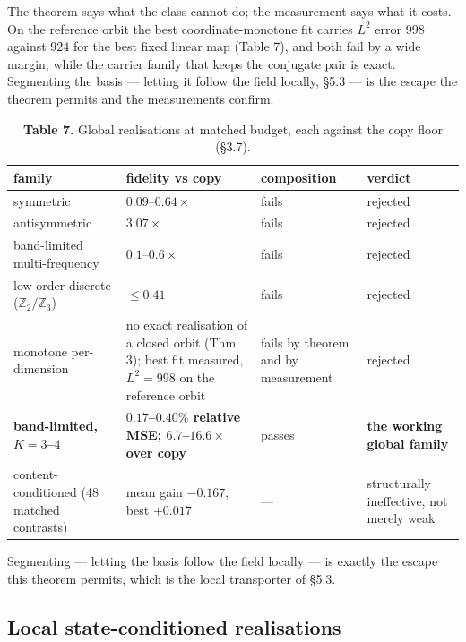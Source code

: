 The theorem says what the class cannot do; the measurement says what it costs. On the reference orbit the best coordinate-monotone fit carries $L^2$ error $998$ against $924$ for the best fixed linear map (Table 7), and both fail by a wide margin, while the carrier family that keeps the conjugate pair is exact. Segmenting the basis --- letting it follow the field locally, \S{}5.3 --- is the escape the theorem permits and the measurements confirm.


\begin{table}[t]
\centering
\small
\caption*{\textbf{Table 7.} Global realisations at matched budget, each against the copy floor (\S{}3.7).}
\begin{tabularx}{\textwidth}{@{}>{\raggedright\arraybackslash}X >{\raggedright\arraybackslash}X >{\raggedright\arraybackslash}X >{\raggedright\arraybackslash}X@{}}
\toprule
\textbf{family} & \textbf{fidelity vs copy} & \textbf{composition} & \textbf{verdict} \\
\midrule
symmetric & $0.09$--$0.64\times$ & fails & rejected \\
antisymmetric & $3.07\times$ & fails & rejected \\
band-limited multi-frequency & $0.1$--$0.6\times$ & fails & rejected \\
low-order discrete ($\mathbb Z_2/\mathbb Z_3$) & $\le 0.41$ & fails & rejected \\
monotone per-dimension & no exact realisation of a closed orbit (Thm 3); best fit measured, $L^2=998$ on the reference orbit & fails by theorem and by measurement & rejected \\
\textbf{band-limited, $K=3$--$4$} & \textbf{$0.17$--$0.40\%$ relative MSE; $6.7$--$16.6\times$ over copy} & passes & \textbf{the working global family} \\
content-conditioned (48 matched contrasts) & mean gain $-0.167$, best $+0.017$ & --- & structurally ineffective, not merely weak \\
\bottomrule
\end{tabularx}
\end{table}

Segmenting --- letting the basis follow the field locally --- is exactly the escape this theorem permits, which is the local transporter of \S{}5.3.

\subsection{Local state-conditioned realisations}

